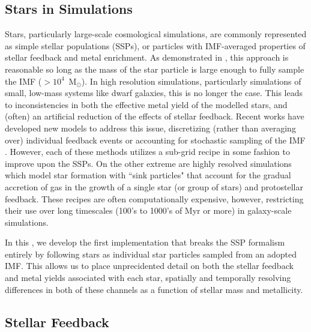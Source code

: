 
\subsection{Stars in Simulations} \label{intro:sec:stars}

Stars, particularly large-scale cosmological simulations, are commonly represented as simple stellar populations (SSPs), or particles with IMF-averaged properties of stellar feedback and metal enrichment. As demonstrated in \cite{Revaz2016}, this approach is reasonable so long as the mass of the star particle is large enough to fully sample the IMF ($> 10^{4}$~M$_{\odot}$). In high resolution simulations, particularly simulations of small, low-mass systems like dwarf galaxies, this is no longer the case. This leads to inconsistencies in both the effective metal yield of the modelled stars, and (often) an artificial reduction of the effects of stellar feedback. Recent works have developed new models to address this issue, discretizing (rather than averaging over) individual feedback events \citep[e.g.][]{MUGS2010,FIRE,Hopkins2018,Rosdahl2018} or accounting for stochastic sampling of the IMF \citep{Hu2016,Hu2017,Applebaum2018,Su2018}. However, each of these methods utilizes a sub-grid recipe in some fashion to improve upon the SSPs. On the other extreme are highly resolved simulations which model star formation with ``sink particles" \citep[see for example ][]{Krumholz2004,Federrath2010,GongOstriker2013,BleulerTeyssier2014,Sormani2017} that account for the gradual accretion of gas in the growth of a single star (or group of stars) and protostellar feedback. These recipes are often computationally expensive, however, restricting their use over long timescales (100's to 1000's of Myr or more) in galaxy-scale simulations.

In this \dissertation, we develop the first implementation that breaks the SSP formalism entirely by following stars as individual star particles sampled from an adopted IMF. This allows us to place unprecidented detail on both the stellar feedback and metal yields associated with each star, spatially and temporally resolving differences in both of these channels as a function of stellar mass and metallicity.

\subsection{Stellar Feedback} \label{intro:sec:feedback}

